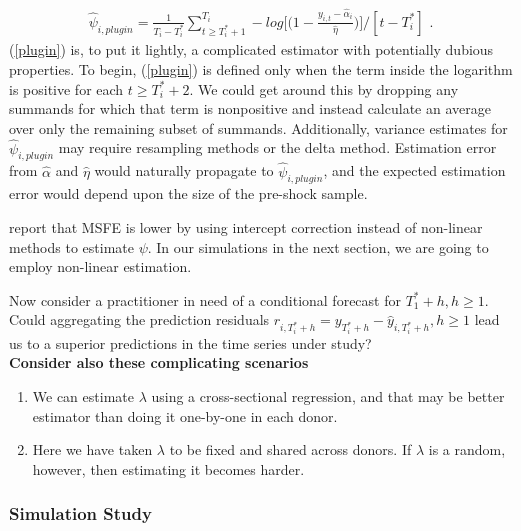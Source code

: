 \documentclass{uiucthesis2021}
\theoremstyle{definition}
\begin{document}
  \begin{align}
  \hat\psi_{i,plugin} = \frac{1}{T_{i}-T_{i}^{*}}\sum^{T_{i}}_{t\geq T_{i}^{*}+1}-log{\big[\big(1-\frac{y_{i,t}-\hat\alpha_{i}}{\hat\eta}\big)\big]} / [t-T_{i}^{*}]\text{ .}\label{plugin}
  \end{align}
  (\ref{plugin}) is, to put it lightly, a complicated estimator with potentially dubious properties.  To begin, (\ref{plugin}) is defined only when the term inside the logarithm is positive for each $t\geq T^{*}_{i}+2$.  We could get around this by dropping any summands for which that term is nonpositive and instead calculate an average over only the remaining subset of summands.  Additionally, variance estimates for $\hat\psi_{i,plugin}$ may require resampling methods or the delta method.  Estimation error from $\hat\alpha$ and $\hat\eta$ would naturally propagate to $\hat\psi_{i,plugin}$, and the expected estimation error would depend upon the size of the pre-shock sample.
  
  \cite[][]{castle2011forecasting} report that MSFE is lower by using intercept correction instead of non-linear methods to estimate $\psi$.  In our simulations in the next section, we are going to employ non-linear estimation.
  
  Now consider a practitioner in need of a conditional forecast for $T_{1}^{*}+h, h\geq 1$.  Could aggregating the prediction residuals $r_{i,T_{i}^{*}+h} = y_{T_{i}^{*}+h}-\hat y_{i, T_{i}^{*}+h}, h\geq 1$ lead us to a superior predictions in the time series under study?\\
  
  \textbf{Consider also these complicating scenarios}
  \begin{enumerate}
    \item We can estimate $\lambda$ using a cross-sectional regression, and that may be better estimator than doing it one-by-one in each donor.
    \item Here we have taken $\lambda$ to be fixed and shared across donors.  If $\lambda$ is a random, however, then estimating it becomes harder.
  \end{enumerate}
  
  \subsubsection{Simulation Study}
  
\end{document}
